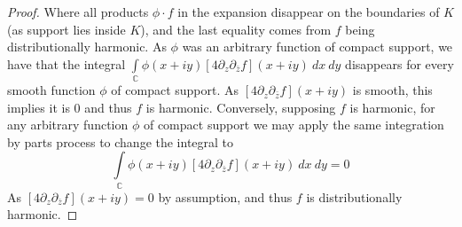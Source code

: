 \documentclass{article}
\newcommand{\bb}[1]{\mathbb{#1}}
\newcommand{\del}{\partial}
\begin{document}
\begin{proof}
  Where all products $\phi \cdot f$ in the expansion disappear on the boundaries of $K$ (as support lies inside $K$), and the last equality comes from $f$ being distributionally harmonic. As $\phi$ was an arbitrary function of compact support, we have that the integral $\int\limits_{\bb{C}}\phi(x+iy)[4\del_{z}\del_{\bar{z}} f](x+iy) \ dx \ dy$ disappears for every smooth function $\phi$ of compact support. As $[4\del_{z}\del_{\bar{z}} f](x+iy)$ is smooth, this implies it is $0$ and thus $f$ is harmonic. Conversely, supposing $f$ is harmonic, for any arbitrary function $\phi$ of compact support we may apply the same integration by parts process to change the integral to
  \[
    \int\limits_{\bb{C}}\phi(x+iy)[4\del_{z}\del_{\bar{z}} f](x+iy) \ dx \ dy = 0
  \]
  As $[4\del_{z}\del_{\bar{z}} f](x+iy) = 0$ by assumption, and thus $f$ is distributionally harmonic. 
\end{proof}
\end{document}
